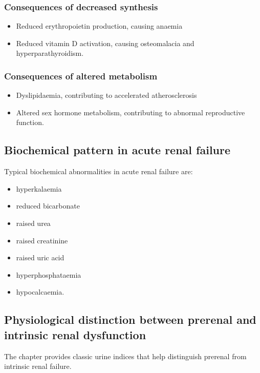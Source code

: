 \documentclass[11pt,a4paper]{article}
\begin{document}
\subsubsection{Consequences of decreased synthesis}

\begin{itemize}
  \item Reduced erythropoietin production, causing anaemia
  \item Reduced vitamin D activation, causing osteomalacia and hyperparathyroidism.
\end{itemize}

\subsubsection{Consequences of altered metabolism}

\begin{itemize}
  \item Dyslipidaemia, contributing to accelerated atherosclerosis
  \item Altered sex hormone metabolism, contributing to abnormal reproductive function.
\end{itemize}

\subsection{Biochemical pattern in acute renal failure}

Typical biochemical abnormalities in acute renal failure are:
\begin{itemize}
  \item hyperkalaemia
  \item reduced bicarbonate
  \item raised urea
  \item raised creatinine
  \item raised uric acid
  \item hyperphosphataemia
  \item hypocalcaemia.
\end{itemize}

\subsection{Physiological distinction between prerenal and intrinsic renal dysfunction}

The chapter provides classic urine indices that help distinguish prerenal from intrinsic renal failure.
\end{document}
